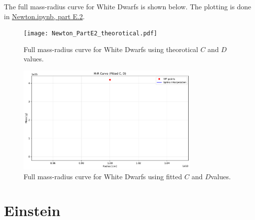 \documentclass[12pt]{article}
\begin{document}
The full mass-radius curve for White Dwarfs is shown below. The plotting is done in \href{Newton.ipynb}{Newton.ipynb, part E.2}.
\begin{figure}[H] %
    \centering
    \texttt{[image: Newton\_PartE2\_theorotical.pdf]}
    \caption{Full mass-radius curve for White Dwarfs using theorotical \(C\) and \(D\) values.}
    \label{fig:newton-parte2t}
\end{figure}

\begin{figure}[H] %
    \centering
    \includegraphics[width=0.8\textwidth]{Newton_PartE2_calculated.pdf}
    \caption{Full mass-radius curve for White Dwarfs using fitted \(C\) and \(D\)values.}
    \label{fig:newton-parte2c}
\end{figure}

\clearpage %

\section*{Einstein}
\end{document}
